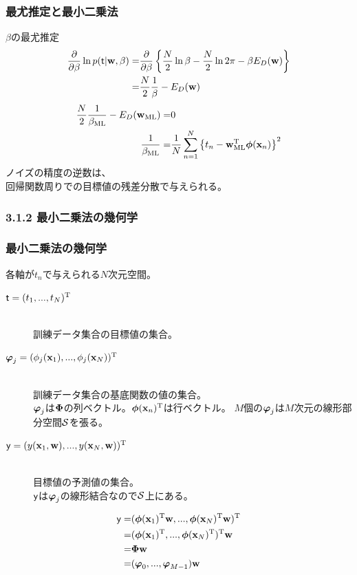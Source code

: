\documentclass[12pt]{beamer}
\begin{document}
\begin{frame}
  \frametitle{最尤推定と最小二乗法}
  \(\beta\)の最尤推定
  \begin{align*}
    \p{}{\beta} \ln p(\tt|\w,\beta)
    = & \p{}{\beta} \l\{ \f{N}{2} \ln \beta - \f{N}{2} \ln 2 \pi - \beta E_D(\w) \r\} \\
    = & \f{N}{2} \f{1}{\beta} - E_D(\w)
  \end{align*}
  \begin{align*}
    \f{N}{2} \f{1}{\beta_{\ML}} - E_D(\w_{\ML}) = & 0 \\
    \f{1}{\beta_{\ML}} = & \f{1}{N} \sum_{n=1}^N \l\{ t_n - \w_{\ML}^\TT \bphi(\x_n) \r\}^2
  \end{align*}
  ノイズの精度の逆数は、\\
  回帰関数周りでの目標値の残差分散で与えられる。
\end{frame}

\subsubsection{3.1.2 最小二乗法の幾何学}

\begin{frame}
  \frametitle{最小二乗法の幾何学}
  各軸が\(t_n\)で与えられる\(N\)次元空間。
  \begin{description}
  \item[\(\tt=(t_1,...,t_N)^\TT\)]　\\
    訓練データ集合の目標値の集合。
  \item[\(\bvphi_j=(\phi_j(\x_1),...,\phi_j(\x_N))^\TT\)]　\\
    訓練データ集合の基底関数の値の集合。\\
    \(\bvphi_j\)は\(\bPhi\)の列ベクトル。\(\bphi(\x_n)^\TT\)は行ベクトル。
    \(M\)個の\(\bvphi_j\)は\(M\)次元の線形部分空間\(\S\)を張る。
  \item[\(\yy=(y(\x_1,\w),...,y(\x_N,\w))^\TT\)]　\\
    目標値の予測値の集合。\\
    \(\yy\)は\(\bvphi_j\)の線形結合なので\(\S\)上にある。
  \end{description}
  \begin{align*}
     \yy = & (\bphi(\x_1)^\TT \w,...,\bphi(\x_N)^\TT \w)^\TT \\
         = & (\bphi(\x_1)^\TT,...,\bphi(\x_N)^\TT)^\TT \w \\
         = & \bPhi \w \\
         = & (\bvphi_0,...,\bvphi_{M-1}) \w \\
\  \end{align*}
\end{frame}
\end{document}
